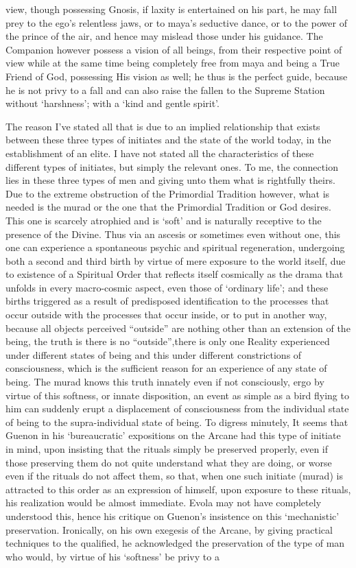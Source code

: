\begin{footnotesize}
\begin{sffamily}
view, though possessing Gnosis, if laxity is entertained on his part, he may fall prey to the ego's relentless jaws, or to maya's seductive dance, or to the power of the prince of the air, and hence may mislead those under his guidance. The Companion however possess a vision of all beings, from their respective point of view while at the same time being completely free from maya and being a True Friend of God, possessing His vision as well; he thus is the perfect guide, because he is not privy to a fall and can also raise the fallen to the Supreme Station without `harshness'; with a `kind and gentle spirit'.

The reason I've stated all that is due to an implied relationship that exists between these three types of initiates and the state of the world today, in the establishment of an elite. I have not stated all the characteristics of these different types of initiates, but simply the relevant ones. To me, the connection lies in these three types of men and giving unto them what is rightfully theirs. Due to the extreme obstruction of the Primordial Tradition however, what is needed is the murad or the one that the Primordial Tradition or God desires. This one is scarcely atrophied and is `soft' and is naturally receptive to the presence of the Divine. Thus via an ascesis or sometimes even without one, this one can experience a spontaneous psychic and spiritual regeneration, undergoing both a second and third birth by virtue of mere exposure to the world itself, due to existence of a Spiritual Order that reflects itself cosmically as the drama that unfolds in every macro-cosmic aspect, even those of `ordinary life'; and these births triggered as a result of predisposed identification to the processes that occur outside with the processes that occur inside, or to put in another way, because all objects perceived ``outside'' are nothing other than an extension of the being, the truth is there is no ``outside'',there is only one Reality experienced under different states of being and this under different constrictions of consciousness, which is the sufficient reason for an experience of any state of being. The murad knows this truth innately even if not consciously, ergo by virtue of this softness, or innate disposition, an event as simple as a bird flying to him can suddenly erupt a displacement of consciousness from the individual state of being to the supra-individual state of being. To digress minutely, It seems that Guenon in his `bureaucratic' expositions on the Arcane had this type of initiate in mind, upon insisting that the rituals simply be preserved properly, even if those preserving them do not quite understand what they are doing, or worse even if the rituals do not affect them, so that, when one such initiate (murad) is attracted to this order as an expression of himself, upon exposure to these rituals, his realization would be almost immediate. Evola may not have completely understood this, hence his critique on Guenon's insistence on this `mechanistic' preservation. Ironically, on his own exegesis of the Arcane, by giving practical techniques to the qualified, he acknowledged the preservation of the type of man who would, by virtue of his `softness' be privy to a 
\end{sffamily}
\end{footnotesize}
